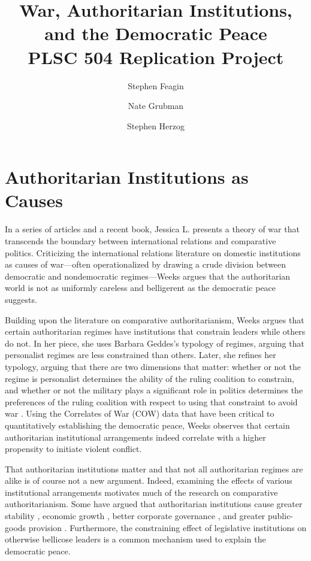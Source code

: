 \documentclass[12pt]{article}
\title{War, Authoritarian Institutions, and the Democratic Peace \\ \bigskip \Large PLSC 504 Replication Project}
\author{Stephen Feagin \and Nate Grubman \and Stephen Herzog}
\begin{document}
\maketitle

\section{Authoritarian Institutions as Causes}

\par In a series of articles and a recent book, Jessica L. \textcites{weeks:2008}{weeks:2012}{weeks:2014} presents a theory of war that transcends the boundary between international relations and comparative politics. Criticizing the international relations literature on domestic institutions as causes of war---often operationalized by drawing a crude division between democratic and nondemocratic regimes---Weeks argues that the authoritarian world is not as uniformly careless and belligerent as the democratic peace suggests. 

\par Building upon the literature on comparative authoritarianism, Weeks argues that certain authoritarian regimes have institutions that constrain leaders while others do not. In her \cite*{weeks:2008} piece, she uses Barbara Geddes's \parencite*{geddes:2003} typology of regimes, arguing that personalist regimes are less constrained than others. Later, she refines her typology, arguing that there are two dimensions that matter: whether or not the regime is personalist determines the ability of the ruling coalition to constrain, and whether or not the military plays a significant role in politics determines the preferences of the ruling coalition with respect to using that constraint to avoid war \autocite[329-330]{weeks:2012}. Using the Correlates of War (COW) data that have been critical to quantitatively establishing the democratic peace, Weeks observes that certain authoritarian institutional arrangements indeed correlate with a higher propensity to initiate violent conflict. 

\par That authoritarian institutions matter and that not all authoritarian regimes are alike is of course not a new argument. Indeed, examining the effects of various institutional arrangements motivates much of the research on comparative authoritarianism. Some have argued that authoritarian institutions cause greater stability \parencite{gandhi:2007}, economic growth \parencite{gandhi:2008}, better corporate governance \parencite{jensen:2014}, and greater public-goods provision \parencite{miller:2015}. Furthermore, the constraining effect of legislative institutions on otherwise bellicose leaders is a common mechanism used to explain the democratic peace. 
\end{document}
